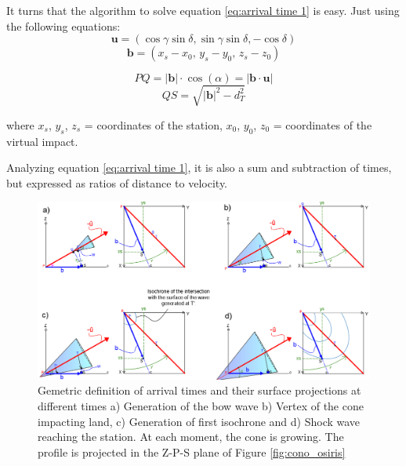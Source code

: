 \documentclass[linenum]{SSA-SRL}
\begin{document}
It turns that the algorithm to solve equation \ref{eq:arrival time 1} is easy. Just using the following equations:
\begin{equation}
\mathbf{u} = (\cos \gamma \sin \delta, \sin \gamma \sin \delta, -\cos \delta)
\end{equation}
\begin{equation}
\mathbf{b} = (x_s - x_0, \, y_s - y_0, \, z_s - z_0)
\end{equation}
\begin{flushleft}
\vspace{0.3cm} %
\begin{equation}
PQ = |\mathbf{b}| \cdot \cos(\alpha) = |\mathbf{b} \cdot \mathbf{u}|
\end{equation}
\begin{equation}
QS = \sqrt{|\mathbf{b}|^2 - d_T^2}
\end{equation}


where $x_s$, $y_s$, $z_s$ = coordinates of the station, $x_0$, $y_0$, $z_0$ = coordinates of the virtual impact.

Analyzing equation \ref{eq:arrival time 1}, it is also a sum and subtraction of times, but expressed as ratios of distance to velocity.
\begin{figure}[t] 
    \centering
\includegraphics[width=1\textwidth]{DIAGRAMAS PUJOL 3.PNG} %
    \caption{Gemetric definition of arrival times and their surface projections at different times a) Generation of the bow wave b) Vertex of the cone impacting land, c) Generation of first isochrone and d) Shock wave reaching the station. At each moment, the cone is growing. The profile is projected in the Z-P-S plane of Figure \ref{fig:cono_osiris} }
    \label{fig:geometría} %
\end{figure}
\vspace{0.5cm} %



\end{flushleft}
\end{document}
